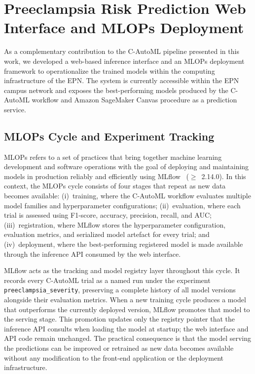 \documentclass[diagnostics,article,submit,pdftex,moreauthors]{Definitions/mdpi}
\begin{document}
\section[\appendixname~\thesection]{Preeclampsia Risk Prediction Web Interface and MLOPs
  Deployment}
\label{app:mlops-interface}


As a complementary contribution to the \ac{C-AutoML} pipeline
presented in this work, we developed a web-based inference interface
and an \ac{MLOPs} deployment framework to operationalize the trained
models within the computing infrastructure of the \ac{EPN}. The system is currently accessible within the \ac{EPN} campus network and exposes the best-performing models produced by the \ac{C-AutoML} workflow and Amazon SageMaker Canvas procedure as a prediction service.

\subsection[\appendixname~\thesubsection]{MLOPs Cycle and Experiment Tracking}

\ac{MLOPs} refers to a set of practices that bring together machine
learning development and software operations with the goal of
deploying and maintaining models in production reliably and
efficiently using MLflow~\cite{mlflow_2018} ($\ge$~2.14.0). In this context, the \ac{MLOPs}
cycle consists of four stages that repeat as new data becomes
available: (i)~training, where the \ac{C-AutoML} workflow evaluates
multiple model families and hyperparameter configurations;
(ii)~evaluation, where each trial is assessed using F1-score,
accuracy, precision, recall, and \ac{AUC}; (iii)~registration, where
MLflow stores the hyperparameter configuration, evaluation metrics,
and serialized model artefact for every trial; and (iv)~deployment,
where the best-performing registered model is made available through
the inference \ac{API} consumed by the web interface.

MLflow acts as the tracking and model registry layer throughout this
cycle. It records every \ac{C-AutoML} trial as a named run under the
experiment \texttt{preeclampsia\_severity}, preserving a complete
history of all model versions alongside their evaluation metrics.
When a new training cycle produces a model that outperforms the
currently deployed version, MLflow promotes that model to the serving
stage. This promotion updates only the registry pointer that the
inference \ac{API} consults when loading the model at startup; the
web interface and \ac{API} code remain unchanged. The practical
consequence is that the model serving the predictions can be improved
or retrained as new data becomes available without any modification
to the front-end application or the deployment infrastructure.
\end{document}

